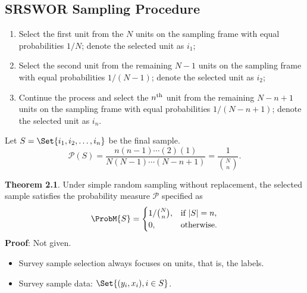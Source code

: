 \subsection*{SRSWOR Sampling Procedure}
\begin{Regular}{}
      \begin{enumerate}[(1)]
            \item Select the first unit from the $N$ units on the sampling frame with
                  equal probabilities $1/N$; denote the selected unit as $i_1$;
            \item Select the second unit from the remaining $ N-1 $ units on the
                  sampling frame with equal probabilities $ 1/(N-1) $; denote the
                  selected unit as $i_2$;
            \item Continue the process and select the $n\textsuperscript{th}$ unit from the remaining
                  $ N-n+1 $ units on the sampling frame with equal probabilities
                  $ 1/(N-n+1) $; denote the selected unit as $ i_n $.
      \end{enumerate}
\end{Regular}
Let $ S=\Set{i_1,i_2,\ldots,i_n} $ be the final sample.
\[ \mathcal{P}(S)=\frac{n(n-1)\cdots(2)(1)}{N(N-1)\cdots(N-n+1)}=\frac{1}{\binom{N}{n}}. \]
\begin{Result}{}
      \textbf{Theorem 2.1}. Under simple random sampling without replacement,
      the selected sample satisfies the probability measure $ \mathcal{P} $ specified as
      \[ \ProbM{S}=\begin{cases}
                  1/\binom{N}{n}, & \text{if $ \abs{S}=n $}, \\
                  0,              & \text{otherwise}.
            \end{cases} \]
      \tcblower{}
      \textbf{Proof}: Not given.
\end{Result}
\begin{itemize}
      \item Survey sample selection always focuses on units, that is, the labels.
      \item Survey sample data: $ \Set{(y_i,x_i),i\in S} $.
\end{itemize}
